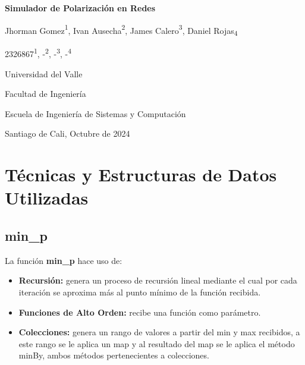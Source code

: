 \documentclass{article}
\begin{document}
  \begin{titlepage}
    \centering
    \vspace*{2cm}
    
    \Huge
    \textbf{Simulador de Polarización en Redes}
    
    \vspace{1.5cm}
    
    \Large
    Jhorman Gomez{\textsuperscript{1}}, Ivan Ausecha{\textsuperscript{2}}, James Calero{\textsuperscript{3}}, Daniel Rojas{\textsubscript{4}}
    
    \vspace{0.5cm}
    
    \large
    2326867{\textsuperscript{1}}, -{\textsuperscript{2}}, -{\textsuperscript{3}}, -{\textsuperscript{4}}
    
    \vspace{0.5cm}
    
    \Large
    Universidad del Valle
    
    \vspace{0.5cm}
    
    \large
    Facultad de Ingeniería
    
    \vspace{0.5cm}
    
    \large
    Escuela de Ingeniería de Sistemas y Computación
    
    \vspace{0.5cm}
    
    \large
    Santiago de Cali, Octubre de 2024
    
  \end{titlepage}

  \section{Técnicas y Estructuras de Datos Utilizadas}
    
    \subsection{min\_p}
    La función \textbf{min\_p} hace uso de:

    \begin{itemize}
      \item \textbf{Recursión:} genera un proceso de recursión lineal mediante el cual por cada iteración se aproxima más al punto mínimo de la función recibida.
      \item \textbf{Funciones de Alto Orden:} recibe una función como parámetro.
      \item \textbf{Colecciones:} genera un rango de valores a partir del min y max recibidos, a este rango se le aplica un map y al resultado del map se le aplica el método minBy, ambos métodos pertenecientes a colecciones.
    \end{itemize}
\end{document}
